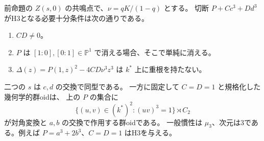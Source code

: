 \begin{theorem}\label{thm:cubic-CY-one-segre-double-split-outer-H3}
前命題の $Z(s,0)$ の共鳴点で、$\nu=qK/(1-q)$ とする。
切断 $P+C c^3+Dd^3$ がH3となる必要十分条件は次の通りである。
\begin{enumerate}
\item $CD\ne0$。
\item $P$ は $[1:0],[0:1]\in\mathbb P^1$ で消える場合、そこで単純に消える。
\item $\Delta(z)=P(1,z)^2-4CD\nu^3 z^3$ は $k^*$ 上に重根を持たない。
\end{enumerate}
二つの $s$ は $c,d$ の交換で同型である。
一方に固定して $C=D=1$ と規格化した幾何学的群oidは、
上の $P$ の集合に
\[
 \{(u,v)\in(k^*)^2:(uv)^3=1\}\rtimes C_2
\]
が対角変換と $a,b$ の交換で作用する群oidである。
一般慣性は $\mu_3$、次元は3である。例えば $P=a^3+2b^3$、$C=D=1$ はH3を与える。
\end{theorem}
